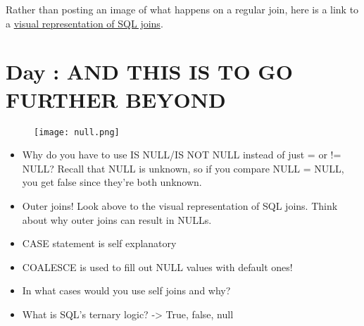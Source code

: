 \documentclass{42-en}
\begin{document}
	Rather than posting an image of what happens on a regular join, here is a link to a \href{https://blog.codinghorror.com/a-visual-explanation-of-sql-joins/}{visual representation 
	of SQL joins}.
\nextexercice


\chapter{Day \exercicenumber: AND THIS IS TO GO FURTHER BEYOND }

\makeheaderfiles

            \begin{figure}[H]
                \begin{center}
                    \texttt{[image: null.png]}
                \end{center}
            \end{figure}

	\begin{itemize}\itemsep1pt 
		\item Why do you have to use IS NULL/IS NOT NULL instead of just = or != NULL? 
			Recall that NULL is unknown, so if you compare NULL = NULL, you get false 
			since they're both unknown. 
		\item Outer joins! Look above to the visual representation of SQL joins. Think about 
			why outer joins can result in NULLs. 
		\item CASE statement is self explanatory
		\item COALESCE is used to fill out NULL values with default ones!   
		\item In what cases would you use self joins and why?  
		\item What is SQL's ternary logic? -> True, false, null
	\end{itemize}
\end{document}
